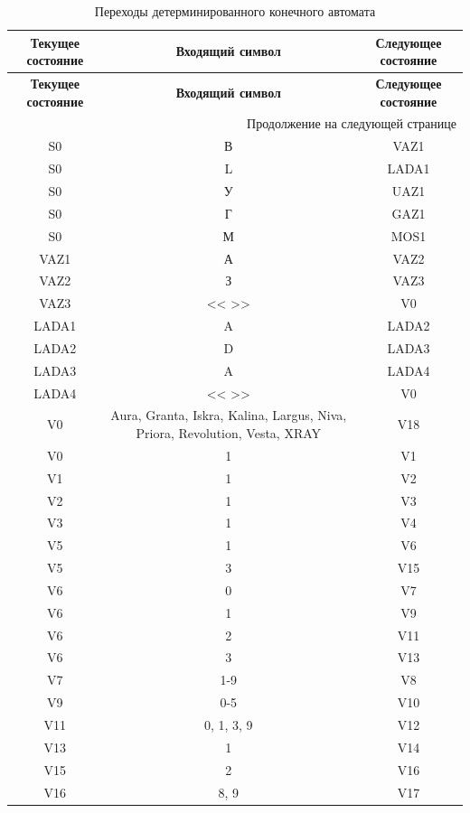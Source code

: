 \documentclass[a4paper,final]{article}
\begin{document}
\begin{longtable}{|c|c|c|}
\caption{Переходы детерминированного конечного автомата} \\
\hline
\textbf{Текущее состояние} & \textbf{Входящий символ} & \textbf{Следующее состояние} \\ \hline
\endfirsthead
\hline
\textbf{Текущее состояние} & \textbf{Входящий символ} & \textbf{Следующее состояние} \\ \hline
\endhead

\hline \multicolumn{3}{r}{{Продолжение на следующей странице}} \\
\endfoot

\hline
\endlastfoot

S0 & В & VAZ1 \\
S0 & L & LADA1 \\
S0 & У & UAZ1 \\
S0 & Г & GAZ1 \\
S0 & М & MOS1 \\
\hline

VAZ1 & А & VAZ2 \\
VAZ2 & З & VAZ3 \\
VAZ3 & << >> & V0 \\
LADA1 & A & LADA2 \\
LADA2 & D & LADA3 \\
LADA3 & A & LADA4 \\
LADA4 & << >> & V0 \\
V0 & \parbox{7cm}{Aura, Granta, Iskra, Kalina, Largus, Niva, Priora, Revolution, Vesta, XRAY} & V18 \\
V0 & 1 & V1 \\
V1 & 1 & V2 \\
V2 & 1 & V3 \\
V3 & 1 & V4 \\
V5 & 1 & V6 \\
V5 & 3 & V15 \\
V6 & 0 & V7 \\
V6 & 1 & V9 \\
V6 & 2 & V11 \\
V6 & 3 & V13 \\
V7 & 1-9 & V8 \\
V9 & 0-5 & V10 \\
V11 & 0, 1, 3, 9 & V12 \\
V13 & 1 & V14 \\
V15 & 2 & V16 \\
V16 & 8, 9 & V17 \\
\hline


\end{longtable}
\end{document}
